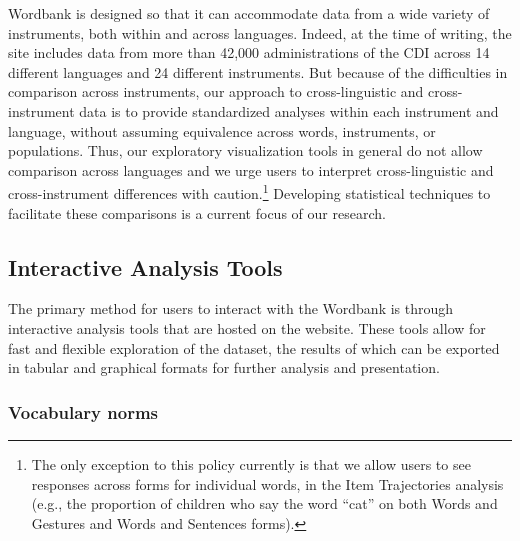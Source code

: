 \documentclass[man,noapacite]{apa}
\begin{document}
Wordbank is designed so that it can accommodate data from a wide variety of instruments, both within and across languages. Indeed, at the time of writing, the site includes data from more than 42,000 administrations of the CDI across 14 different languages and 24 different instruments. But because of the difficulties in comparison across instruments, our approach to cross-linguistic and cross-instrument data is to provide standardized analyses within each instrument and language, without assuming equivalence across words, instruments, or populations. Thus, our exploratory visualization tools in general do not allow comparison across languages and we urge users to interpret cross-linguistic and cross-instrument differences with caution.\footnote{The only exception to this policy currently is that we allow users to see responses across forms for individual words, in the Item Trajectories analysis (e.g., the proportion of children who say the word ``cat'' on both Words and Gestures and Words and Sentences forms).} Developing statistical techniques to facilitate these comparisons is a current focus of our research. 

\subsection{Interactive Analysis Tools}

The primary method for users to interact with the Wordbank is through interactive analysis tools that are hosted on the website. These tools allow for fast and flexible exploration of the dataset, the results of which can be exported in tabular and graphical formats for further analysis and presentation. 

\subsubsection{Vocabulary norms}
\end{document}
